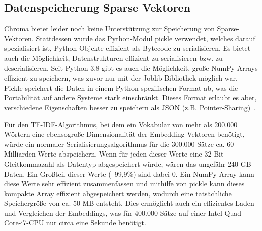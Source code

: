 \subsection{Datenspeicherung Sparse Vektoren}

Chroma bietet leider noch keine Unterstützung zur Speicherung von Sparse-Vektoren.
Stattdessen wurde das Python-Modul pickle verwendet, welches darauf spezialisiert ist, Python-Objekte effizient als Bytecode zu serialisieren.
Es bietet auch die Möglichkeit, Datenstrukturen effizient zu serialisieren bzw. zu deserialisieren.
Seit Python 3.8 gibt es auch die Möglichkeit, große NumPy-Arrays effizient zu speichern, was zuvor nur mit der Joblib-Bibliothek möglich war.
Pickle speichert die Daten in einem Python-spezifischen Format ab, was die Portabilität auf andere Systeme stark einschränkt.
Dieses Format erlaubt es aber, verschiedene Eigenschaften besser zu speichern als JSON (z.B. Pointer-Sharing)~\cite{pickle}.

Für den TF-IDF-Algorithmus, bei dem ein Vokabular von mehr als 200.000 Wörtern eine ebensogroße Dimensionalität der Embedding-Vektoren benötigt, würde ein normaler Serialisierungsalgorithmus für die 300.000 Sätze ca. 60 Milliarden Werte abspeichern.
Wenn für jeden dieser Werte eine 32-Bit-Gleitkommazahl als Datentyp abgespeichert würde, wären das ungefähr 240 GB Daten.
Ein Großteil dieser Werte (~99,9\%) sind dabei 0.
Ein NumPy-Array kann diese Werte sehr effizient zusammenfassen und mithilfe von pickle kann dieses kompakte Array effizient abgespeichert werden, wodurch eine tatsächliche Speichergröße von ca. 50 MB entsteht.
Dies ermöglicht auch ein effizientes Laden und Vergleichen der Embeddings, was für 400.000 Sätze auf einer Intel Quad-Core-i7-CPU nur circa eine Sekunde benötigt.